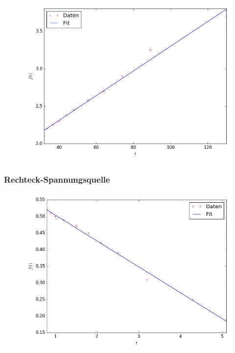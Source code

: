 \begin{figure}[H]
	\centering
	\caption{}
	\includegraphics[width=\linewidth-150pt,height=\textheight-150pt,keepaspectratio]{GleichstromR.png}
	\label{fig:GleichstromR}
\end{figure}


\newpage
\subsubsection{Rechteck-Spannungsquelle}

\begin{figure}[H]
	\centering
	\caption{}
	\includegraphics[width=\linewidth-150pt,height=\textheight-150pt,keepaspectratio]{Rechteck.png}
	\label{fig:Rechteck}
\end{figure}



